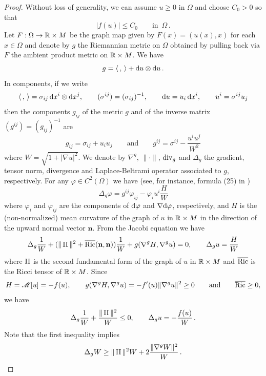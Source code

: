 \documentclass[10 pt,a4paper]{article}
\theoremstyle{definition}
\begin{document}
\begin{proof}
	
	Without loss of generality, we can assume $u\geq 0$ in $\Omega$ and choose $C_0>0$ so that
	\[
		|f(u)| \leq C_0 \qquad \text{in } \, \Omega \, .
	\]
	Let $F : \Omega \to \mathbb R\times M$ be the graph map given by $F(x) = (u(x),x)$ for each $x\in\Omega$ and denote by $g$ the Riemannian metric on $\Omega$ obtained by pulling back via $F$ the ambient product metric on $\mathbb R\times M$. We have
	\[
		g = \langle \, , \, \rangle + \mathrm{d} u \otimes \mathrm{d} u \, .
	\]
	In components, if we write
	\[
		\langle \, , \, \rangle = \sigma_{ij} \, \mathrm{d} x^i \otimes \mathrm{d} x^j, \qquad (\sigma^{ij}) = (\sigma_{ij})^{-1}, \qquad \mathrm{d} u = u_i \, \mathrm{d} x^i, \qquad u^i = \sigma^{ij} u_j
	\]
	then the components $g_{ij}$ of the metric $g$ and of the inverse matrix $(g^{ij}) = (g_{ij})^{-1}$ are
	\begin{equation} \label{gij}
		g_{ij} = \sigma_{ij} + u_i u_j \qquad \text{and} \qquad g^{ij} = \sigma^{ij} - \frac{u^i u^j}{W^2}
	\end{equation}
	where $W = \sqrt{1+|\nabla u|^2}$. We denote by $\nabla^g$, $\|\cdot\|$, $\mathrm{div}_g$ and $\Delta_g$ the gradient, tensor norm, divergence and Laplace-Beltrami operator associated to $g$, respectively. For any $\varphi\in C^2(\Omega)$ we have (see, for instance, formula (25) in \cite{cmr})
	\begin{equation} \label{Lapg}
		\Delta_g \varphi = g^{ij} \varphi_{ij} - \varphi_i u^i \frac{H}{W}
	\end{equation}
	where $\varphi_i$ and $\varphi_{ij}$ are the components of $\mathrm{d}\varphi$ and $\nabla\mathrm{d}\varphi$, respectively, and $H$ is the (non-normalized) mean curvature of the graph of $u$ in $\mathbb R\times M$ in the direction of the upward normal vector $\mathbf{n}$. From the Jacobi equation we have
	\[
		\Delta_g \frac{1}{W} + (\|\operatorname{II}\|^2 + \overline{\mathrm{Ric}}(\mathbf{n},\mathbf{n})) \frac{1}{W} + g(\nabla^g H,\nabla^g u) = 0, \qquad \Delta_g u = \frac{H}{W}
	\]
	where $\operatorname{II}$ is the second fundamental form of the graph of $u$ in $\mathbb R\times M$ and $\overline{\mathrm{Ric}}$ is the Ricci tensor of $\mathbb R\times M$. %
	Since
	\[
		H = \mathscr{M}[u] = -f(u), \qquad g(\nabla^g H,\nabla^g u) = -f'(u)\|\nabla^g u\|^2 \geq 0 \qquad \text{and} \qquad \overline{\mathrm{Ric}} \geq 0,
	\]
	we have
	\begin{equation} \label{DeltaWu}
		\Delta_g \frac{1}{W} + \frac{\|\operatorname{II}\|^2}{W} \leq 0, \qquad \Delta_g u = - \frac{f(u)}{W} \, .
	\end{equation}
	Note that the first inequality implies
	\begin{equation} \label{DeltaW2}
		\Delta_g W \geq \|\operatorname{II}\|^2 W + 2 \frac{\|\nabla^g W\|^2}{W} \, .
	\end{equation}
	

\end{proof}
\end{document}
